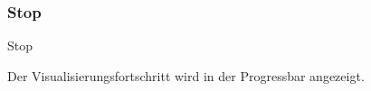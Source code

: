 \subsubsection{Stop}
\begin{usecase}{Stop}
    \precondition{
	    
    }
    \postconditions{
	    \item 
	    \item 
    }
    \mainsuccess{
	    \item 
    }
    \extensions{
	    \item[1.a]
		    \begin{enumerate}
			\item 
		    \end{enumerate}
    }
\end{usecase}
\newpage
% 

Der Visualisierungsfortschritt wird in der Progressbar angezeigt.